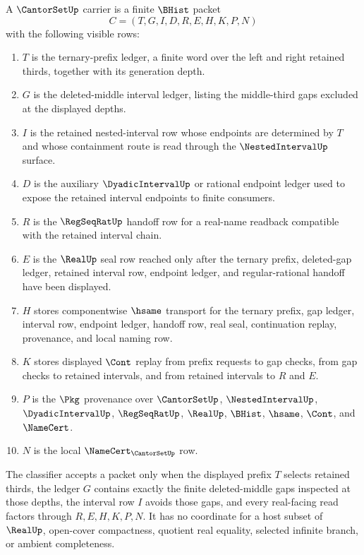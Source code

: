 \begin{definition}
\label{def:cantor-set-carrier}
A $\CantorSetUp$ carrier is a finite $\BHist$ packet
$$
C=(T,G,I,D,R,E,H,K,P,N)
$$
with the following visible rows:
\begin{enumerate}
\item $T$ is the ternary-prefix ledger, a finite word over the left and right retained thirds, together with its generation depth.
\item $G$ is the deleted-middle interval ledger, listing the middle-third gaps excluded at the displayed depths.
\item $I$ is the retained nested-interval row whose endpoints are determined by $T$ and whose containment route is read through the $\NestedIntervalUp$ surface.
\item $D$ is the auxiliary $\DyadicIntervalUp$ or rational endpoint ledger used to expose the retained interval endpoints to finite consumers.
\item $R$ is the $\RegSeqRatUp$ handoff row for a real-name readback compatible with the retained interval chain.
\item $E$ is the $\RealUp$ seal row reached only after the ternary prefix, deleted-gap ledger, retained interval row, endpoint ledger, and regular-rational handoff have been displayed.
\item $H$ stores componentwise $\hsame$ transport for the ternary prefix, gap ledger, interval row, endpoint ledger, handoff row, real seal, continuation replay, provenance, and local naming row.
\item $K$ stores displayed $\Cont$ replay from prefix requests to gap checks, from gap checks to retained intervals, and from retained intervals to $R$ and $E$.
\item $P$ is the $\Pkg$ provenance over $\CantorSetUp$, $\NestedIntervalUp$, $\DyadicIntervalUp$, $\RegSeqRatUp$, $\RealUp$, $\BHist$, $\hsame$, $\Cont$, and $\NameCert$.
\item $N$ is the local $\NameCert_{\CantorSetUp}$ row.
\end{enumerate}
The classifier accepts a packet only when the displayed prefix $T$ selects retained thirds, the ledger $G$ contains exactly the finite deleted-middle gaps inspected at those depths, the interval row $I$ avoids those gaps, and every real-facing read factors through $R,E,H,K,P,N$. It has no coordinate for a host subset of $\RealUp$, open-cover compactness, quotient real equality, selected infinite branch, or ambient completeness.
\end{definition}

